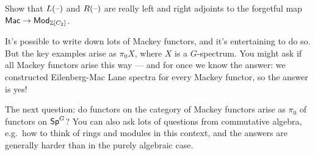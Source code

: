 \begin{beast}
\end{beast}
\begin{ex}
Show that $L(\text{--})$ and $R(\text{--})$ are really left and right adjoints to the forgetful map
$\to\Mod_{\Z[C_2]}$.
\end{ex}
It's possible to write down lots of Mackey functors, and it's entertaining to do so. But the key examples arise as
$\pi_0 X$, where $X$ is a $G$-spectrum. You might ask if all Mackey functors arise this way --- and for once we
know the answer: we constructed Eilenberg-Mac Lane spectra for every Mackey functor, so the answer is
yes!

The next question: do functors on the category of Mackey functors arise as $\pi_0$ of functors on $\mathsf{Sp}^G$? You can
also ask lots of questions from commutative algebra, e.g.\ how to think of rings and modules in this context, and
the answers are generally harder than in the purely algebraic case.


